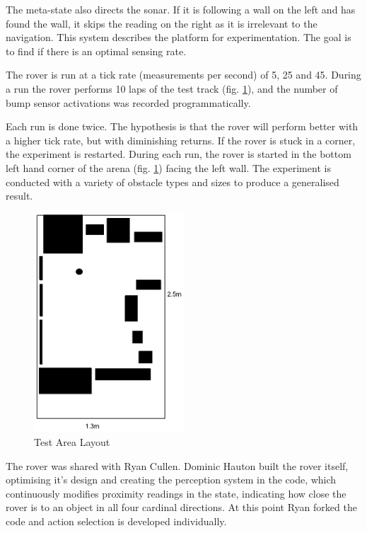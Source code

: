 \documentclass[a4paper,12pt,twocolumn]{report}
\begin{document}
The meta-state also directs the sonar. If it is following a wall on the left and has found the wall, it skips the reading on the right as it is irrelevant to the navigation. This system describes the platform for experimentation. The goal is to find if there is an optimal sensing rate.

The rover is run at a tick rate (measurements per second) of 5, 25 and 45. During a run the rover performs 10 laps of the test track (fig. \ref{fig:area}), and the number of bump sensor activations was recorded programmatically.

Each run is done twice. The hypothesis is that the rover will perform better with a higher tick rate, but with diminishing returns. If the rover is stuck in a corner, the experiment is restarted. During each run, the rover is started in the bottom left hand corner of the arena (fig. \ref{fig:area}) facing the left wall. The experiment is conducted with a variety of obstacle types and sizes to produce a generalised result.

\begin{figure}[t]
 \includegraphics[width=0.5\textwidth]{test-area-layout}
 \caption{Test Area Layout}
 \label{fig:area}
\end{figure}

The rover was shared with Ryan Cullen. Dominic Hauton built the rover itself, optimising it's design and creating the perception system in the code, which continuously modifies proximity readings in the state, indicating how close the rover is to an object in all four cardinal directions. At this point Ryan forked the code and action selection is developed individually.
\end{document}
